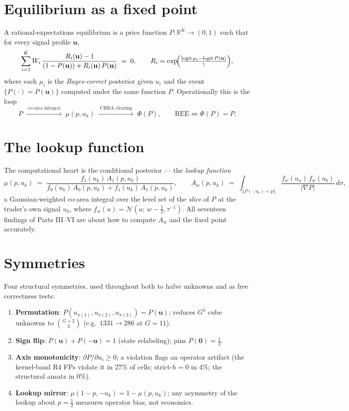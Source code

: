 \documentclass[11pt]{report}
\newcommand{\strict}{strict-$h{=}0$}
\begin{document}
\section{Equilibrium as a fixed point}
A rational-expectations equilibrium is a price function
$P : \mathbb{R}^K \to (0,1)$ such that for every signal profile
$\mathbf{u}$,
\[
  \sum_{i=1}^{K} W_i\,
  \frac{R_i(\mathbf{u}) - 1}{(1 - P(\mathbf{u})) + R_i(\mathbf{u})\,P(\mathbf{u})}
  \;=\; 0,
  \qquad
  R_i = \exp\!\Bigl(\tfrac{\operatorname{logit}\mu_i - \operatorname{logit}P(\mathbf{u})}{\gamma}\Bigr),
\]
where each $\mu_i$ is the \emph{Bayes-correct} posterior given $u_i$ and
the event $\{P(\cdot) = P(\mathbf{u})\}$ computed under the same
function $P$. Operationally this is the loop
\[
  P \;\xrightarrow{\;\text{co-area integral}\;}\; \mu(p, u_k)
  \;\xrightarrow{\;\text{CRRA clearing}\;}\; \Phi(P),
  \qquad \text{REE} \iff \Phi(P) = P .
\]

\section{The lookup function}
The computational heart is the conditional posterior --- the
\emph{lookup function}
\[
  \mu(p, u_k) \;=\;
  \frac{ f_1(u_k)\, A_1(p, u_k) }
       { f_0(u_k)\, A_0(p, u_k) + f_1(u_k)\, A_1(p, u_k) },
  \qquad
  A_w(p, u_k) \;=\; \int_{\{P(\cdot, u_k) = p\}}
      \frac{f_w(u_a)\, f_w(u_b)}{|\nabla P|}\, d\sigma ,
\]
a Gaussian-weighted co-area integral over the level set of the
\emph{slice} of $P$ at the trader's own signal $u_k$, where
$f_w(u) = \mathcal{N}(u;\, w - \tfrac12, \tau^{-1})$. All seventeen
findings of Parts III--VI are about how to compute $A_w$ and the fixed
point accurately.

\section{Symmetries}
Four structural symmetries, used throughout both to halve unknowns and
as free correctness tests:
\begin{enumerate}\itemsep2pt
  \item \textbf{Permutation}: $P(u_{\pi(1)}, u_{\pi(2)}, u_{\pi(3)}) =
        P(\mathbf{u})$; reduces $G^3$ cube unknowns to
        $\binom{G+2}{3}$ (e.g.\ $1331 \to 286$ at $G{=}11$).
  \item \textbf{Sign flip}: $P(\mathbf{u}) + P(-\mathbf{u}) = 1$ (state
        relabeling); pins $P(\mathbf{0}) = \tfrac12$.
  \item \textbf{Axis monotonicity}: $\partial P/\partial u_i \ge 0$; a
        violation flags an operator artifact (the kernel-band R4 FPs
        violate it in 27\% of cells; \strict{} in 4\%; the structural
        ansatz in 0\%).
  \item \textbf{Lookup mirror}: $\mu(1 - p, -u_k) = 1 - \mu(p, u_k)$;
        any asymmetry of the lookup about $p = \tfrac12$ measures
        operator bias, not economics.
\end{enumerate}
\end{document}
